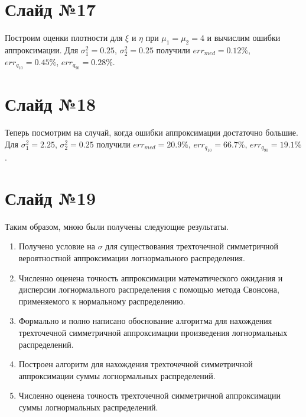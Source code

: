 \documentclass[specialist, substylefile = spbu.rtx,
subf,href,colorlinks=true, 12pt]{disser}
\begin{document}
\section*{Слайд №17}
Построим оценки плотности для $\xi$ и $\eta$ при $\mu_{1} = \mu_{2} = 4$ и вычислим ошибки аппроксимации. Для $\sigma_{1}^{2} = 0.25$, $\sigma_{2}^{2} = 0.25$ получили $err_{med} = 0.12\%$,  $err_{q_{10}} = 0.45\%$,  $err_{q_{90}} = 0.28\%$.

\section*{Слайд №18}

Теперь посмотрим на случай, когда ошибки аппроксимации достаточно большие. Для $\sigma_{1}^{2} = 2.25$, $\sigma_{2}^{2} = 0.25$ получили $err_{med} = 20.9\%$,  $err_{q_{10}} = 66.7\%$,  $err_{q_{90}} = 19.1\%$.

\section*{Слайд №19}
Таким образом, мною были получены следующие результаты. 
\begin{enumerate}
	\item Получено условие на $\sigma$ для существования трехточечной симметричной вероятностной аппроксимации логнормального распределения.
	\item Численно оценена точность аппроксимации математического ожидания и дисперсии логнормального распределения с помощью метода Свонсона, применяемого к нормальному распределению.
	\item Формально и полно написано обоснование алгоритма для нахождения трехточечной симметричной аппроксимации произведения логнормальных распределений.
	\item Построен алгоритм для нахождения трехточечной симметричной аппроксимации суммы логнормальных распределений.
	\item Численно оценена точность трехточечной симметричной аппроксимации суммы логнормальных распределений.
\end{enumerate}
	
\end{document}
